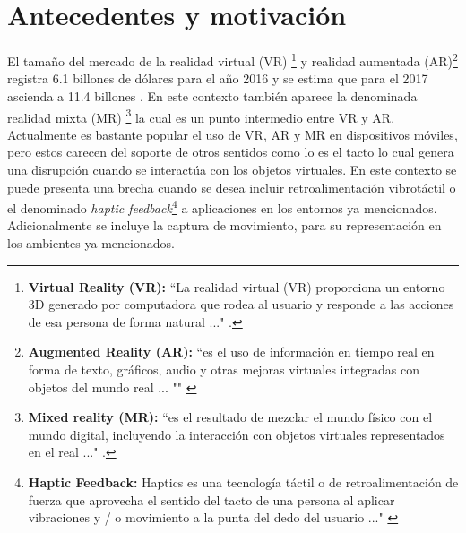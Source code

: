 \section{Antecedentes y motivación}

El tamaño del mercado de la realidad virtual (VR) \footnote{\textbf{Virtual Reality (VR):}  ``La realidad virtual (VR) proporciona un entorno 3D generado por computadora que rodea al usuario y responde a las acciones de esa persona de forma natural ..." \cite{gartner-group-VR}.}  y realidad aumentada (AR)\footnote{\textbf{Augmented Reality (AR):} ``es el uso de información en tiempo real en forma de texto, gráficos, audio y otras mejoras virtuales integradas con objetos del mundo real ... "" \citep{gartner-group-AR}} registra 6.1 billones de dólares para el año 2016 y se estima que para el 2017 ascienda a 11.4 billones \citep{statista-VR-AR}.  En este contexto también aparece la denominada realidad mixta (MR) \footnote{\textbf{Mixed reality (MR):} ``es el resultado de mezclar el mundo físico con el mundo digital,  incluyendo la interacción con objetos virtuales representados en el real ..." \citep{microsoft-MR}.} la cual es un punto intermedio entre VR y AR.  Actualmente es bastante popular el  uso de VR, AR y MR en dispositivos móviles, pero estos carecen del soporte de otros sentidos como lo es el tacto lo cual genera una disrupción cuando se interactúa con los objetos virtuales. En este contexto se puede presenta una brecha cuando se desea incluir retroalimentación vibrotáctil o el denominado \textit{haptic feedback}\footnote{\textbf{Haptic Feedback:} Haptics es una tecnología táctil o de retroalimentación de fuerza que aprovecha el sentido del tacto de una persona al aplicar vibraciones y / o movimiento a la punta del dedo del usuario ..." \citep{gartner-group-haptics}} a aplicaciones en los entornos ya mencionados. Adicionalmente se incluye la captura de movimiento, para su representación en  los ambientes ya mencionados.

